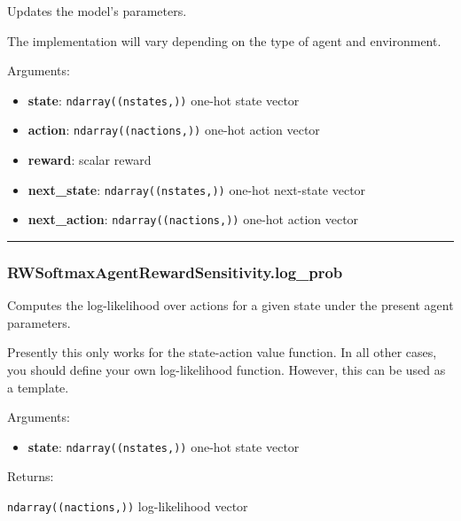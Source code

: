 Updates the model's parameters.

The implementation will vary depending on the type of agent and
environment.

Arguments:

\begin{itemize}
\tightlist
\item
  \textbf{state}: \texttt{ndarray((nstates,))} one-hot state vector
\item
  \textbf{action}: \texttt{ndarray((nactions,))} one-hot action vector
\item
  \textbf{reward}: scalar reward
\item
  \textbf{next\_state}: \texttt{ndarray((nstates,))} one-hot next-state
  vector
\item
  \textbf{next\_action}: \texttt{ndarray((nactions,))} one-hot action
  vector
\end{itemize}

\begin{center}\rule{0.5\linewidth}{\linethickness}\end{center}

\subsubsection{RWSoftmaxAgentRewardSensitivity.log\_prob}\label{rwsoftmaxagentrewardsensitivity.log_prob}

\begin{Shaded}
\begin{Highlighting}[]
\end{Highlighting}
\end{Shaded}

Computes the log-likelihood over actions for a given state under the
present agent parameters.

Presently this only works for the state-action value function. In all
other cases, you should define your own log-likelihood function.
However, this can be used as a template.

Arguments:

\begin{itemize}
\tightlist
\item
  \textbf{state}: \texttt{ndarray((nstates,))} one-hot state vector
\end{itemize}

Returns:

\texttt{ndarray((nactions,))} log-likelihood vector

